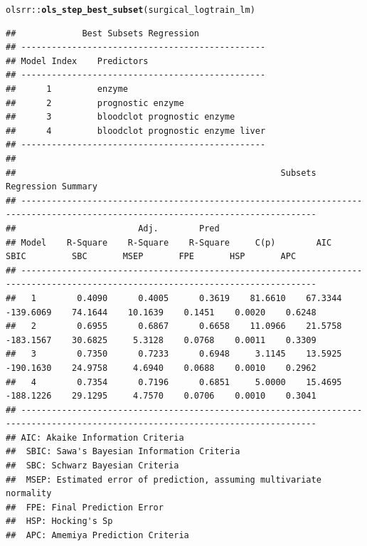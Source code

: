 \documentclass{article}\usepackage[]{graphicx}\usepackage[]{color}
\makeatletter
\newcommand{\hlopt}[1]{\textcolor[rgb]{0,0,0}{#1}}%
\newcommand{\hlstd}[1]{\textcolor[rgb]{0.345,0.345,0.345}{#1}}%
\newcommand{\hlkwd}[1]{\textcolor[rgb]{0.737,0.353,0.396}{\textbf{#1}}}%
\newenvironment{kframe}{%
 \def\at@end@of@kframe{}%
 \ifinner\ifhmode%
  \def\at@end@of@kframe{\end{minipage}}%
  \begin{minipage}{\columnwidth}%
 \fi\fi%
 \def\FrameCommand##1{\hskip\@totalleftmargin \hskip-\fboxsep
 \colorbox{shadecolor}{##1}\hskip-\fboxsep
     \hskip-\linewidth \hskip-\@totalleftmargin \hskip\columnwidth}%
 \MakeFramed {\advance\hsize-\width
   \@totalleftmargin\z@ \linewidth\hsize
   \@setminipage}}%
 {\par\unskip\endMakeFramed%
 \at@end@of@kframe}
\newenvironment{knitrout}{}{} %
\makeatother
\begin{document}
\begin{knitrout}
\color{fgcolor}\begin{kframe}
\begin{alltt}
\hlstd{olsrr}\hlopt{::}\hlkwd{ols_step_best_subset}\hlstd{(surgical_logtrain_lm)}
\end{alltt}
\begin{verbatim}
##             Best Subsets Regression             
## ------------------------------------------------
## Model Index    Predictors
## ------------------------------------------------
##      1         enzyme                            
##      2         prognostic enzyme                 
##      3         bloodclot prognostic enzyme       
##      4         bloodclot prognostic enzyme liver 
## ------------------------------------------------
## 
##                                                    Subsets Regression Summary                                                   
## --------------------------------------------------------------------------------------------------------------------------------
##                        Adj.        Pred                                                                                          
## Model    R-Square    R-Square    R-Square     C(p)        AIC        SBIC         SBC       MSEP       FPE       HSP       APC  
## --------------------------------------------------------------------------------------------------------------------------------
##   1        0.4090      0.4005      0.3619    81.6610    67.3344    -139.6069    74.1644    10.1639    0.1451    0.0020    0.6248 
##   2        0.6955      0.6867      0.6658    11.0966    21.5758    -183.1567    30.6825     5.3128    0.0768    0.0011    0.3309 
##   3        0.7350      0.7233      0.6948     3.1145    13.5925    -190.1630    24.9758     4.6940    0.0688    0.0010    0.2962 
##   4        0.7354      0.7196      0.6851     5.0000    15.4695    -188.1226    29.1295     4.7570    0.0706    0.0010    0.3041 
## --------------------------------------------------------------------------------------------------------------------------------
## AIC: Akaike Information Criteria 
##  SBIC: Sawa's Bayesian Information Criteria 
##  SBC: Schwarz Bayesian Criteria 
##  MSEP: Estimated error of prediction, assuming multivariate normality 
##  FPE: Final Prediction Error 
##  HSP: Hocking's Sp 
##  APC: Amemiya Prediction Criteria
\end{verbatim}
\end{kframe}
\end{knitrout}
\end{document}
